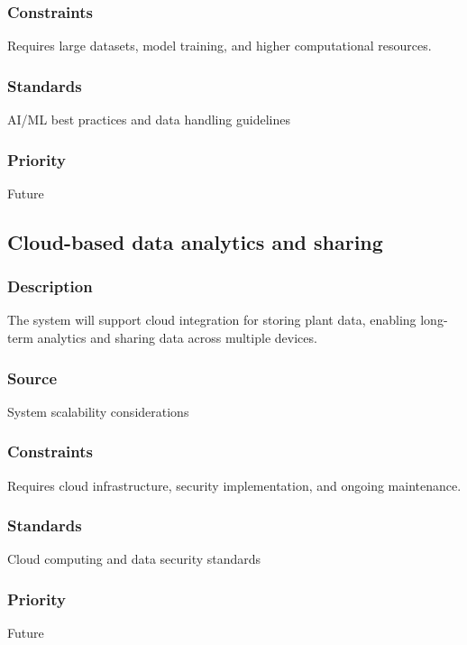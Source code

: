 \subsubsection{Constraints}
Requires large datasets, model training, and higher computational resources.
\subsubsection{Standards}
AI/ML best practices and data handling guidelines
\subsubsection{Priority}
Future

\subsection{Cloud-based data analytics and sharing}
\subsubsection{Description}
The system will support cloud integration for storing plant data, enabling long-term analytics and sharing data across multiple devices.
\subsubsection{Source}
System scalability considerations
\subsubsection{Constraints}
Requires cloud infrastructure, security implementation, and ongoing maintenance.
\subsubsection{Standards}
Cloud computing and data security standards
\subsubsection{Priority}
Future